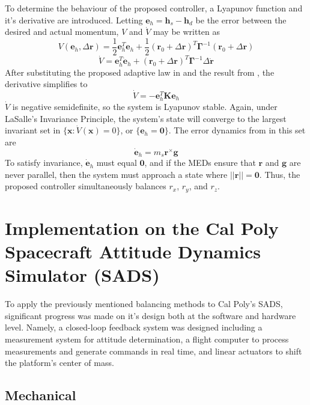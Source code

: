 To determine the behaviour of the proposed controller, a Lyapunov function and it's derivative are introduced. Letting $\bm{e}_h=\bm{h}_s-\bm{h}_d$ be the error between the desired and actual momentum, $V$ and $\dot{V}$ may be written as
\begin{equation}
    V(\bm{e}_h,\Delta\bm{r})=\frac{1}{2}\bm{e}_h^T\bm{e}_h
    +\frac{1}{2}(\bm{r}_0+\Delta\bm{r})^T\bm{\Gamma}^{-1}(\bm{r}_0+\Delta\bm{r})
\end{equation}
\begin{equation}
    \dot{V}=\bm{e}_h^T\dot{\bm{e}}_h
    +(\bm{r}_0+\Delta\bm{r})^T\bm{\Gamma}^{-1}\Delta\dot{\bm{r}}
\end{equation}
After substituting the proposed adaptive law in  and the result from , the derivative simplifies to 
\begin{equation}
    \dot{V}=-\bm{e}_h^T\bm{K}\bm{e}_h
\end{equation}
$\dot{V}$ is negative semidefinite, so the system is Lyapunov stable. Again, under LaSalle's Invariance Principle, the system's state will converge to the largest invariant set in $\{\bm{x}:\dot V(\bm{x})=0 \}$, or $\{\bm{e}_h=\bm{0}\}$. The error dynamics from  in this set are
\begin{equation}
    \dot{\bm{e}}_h=m_s\bm{r}^{\times}\bm{g}
\end{equation}
To satisfy invariance, $\dot{\bm{e}}_h$ must equal $\bm{0}$, and if the MEDs ensure that $\bm{r}$ and ${\bm{g}}$ are never parallel, then the system must approach a state where $||\bm{r}||=\bm{0}$. Thus, the proposed controller simultaneously balances $r_x$, $r_y$, and $r_z$.

\section{Implementation on the Cal Poly Spacecraft Attitude Dynamics Simulator (SADS)}

To apply the previously mentioned balancing methods to Cal Poly's SADS, significant progress was made on it's design both at the software and hardware level. Namely, a closed-loop feedback system was designed including a measurement system for attitude determination, a flight computer to process measurements and generate commands in real time, and linear actuators to shift the platform's center of mass.

\subsection{Mechanical}

